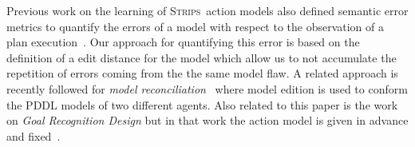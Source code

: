 \documentclass[letterpaper]{article} %
\newcommand{\strips}{\textsc{Strips}}     %
\begin{document}
Previous work on the learning of \strips\ action models also defined semantic error metrics to quantify the errors of a model with respect to the observation of a plan execution~\cite{yang2007learning}. Our approach for quantifying this error is based on the definition of a edit distance for the model which allow us to not accumulate the repetition of errors coming from the the same model flaw. A related approach is recently followed for {\em model reconciliation}~\cite{Kambhampati:mreconciliation:ijcai17} where model edition is used to conform the PDDL models of two different agents. Also  related to this paper is the work on {\em Goal Recognition Design} but in that work the action model is given in advance and fixed~\cite{keren2014goal}.  






\end{document}
